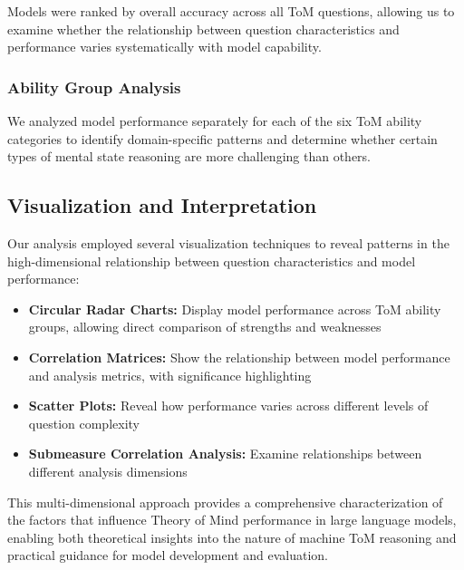 \documentclass[12pt]{article}
\begin{document}
Models were ranked by overall accuracy across all ToM questions, allowing us to examine whether the relationship between question characteristics and performance varies systematically with model capability.

\subsubsection{Ability Group Analysis}

We analyzed model performance separately for each of the six ToM ability categories to identify domain-specific patterns and determine whether certain types of mental state reasoning are more challenging than others.

\subsection{Visualization and Interpretation}

Our analysis employed several visualization techniques to reveal patterns in the high-dimensional relationship between question characteristics and model performance:

\begin{itemize}
    \item \textbf{Circular Radar Charts:} Display model performance across ToM ability groups, allowing direct comparison of strengths and weaknesses
    \item \textbf{Correlation Matrices:} Show the relationship between model performance and analysis metrics, with significance highlighting
    \item \textbf{Scatter Plots:} Reveal how performance varies across different levels of question complexity
    \item \textbf{Submeasure Correlation Analysis:} Examine relationships between different analysis dimensions
\end{itemize}

This multi-dimensional approach provides a comprehensive characterization of the factors that influence Theory of Mind performance in large language models, enabling both theoretical insights into the nature of machine ToM reasoning and practical guidance for model development and evaluation.
\end{document}
